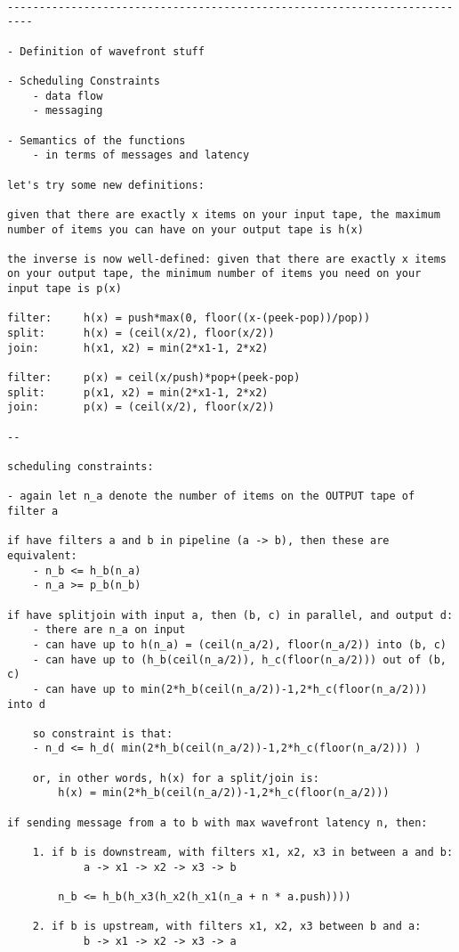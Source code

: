 \begin{verbatim}

--------------------------------------------------------------------------

- Definition of wavefront stuff

- Scheduling Constraints
	- data flow
	- messaging

- Semantics of the functions
	- in terms of messages and latency

let's try some new definitions:

given that there are exactly x items on your input tape, the maximum
number of items you can have on your output tape is h(x)

the inverse is now well-defined: given that there are exactly x items
on your output tape, the minimum number of items you need on your
input tape is p(x)

filter:		h(x) = push*max(0, floor((x-(peek-pop))/pop))
split:		h(x) = (ceil(x/2), floor(x/2))
join:		h(x1, x2) = min(2*x1-1, 2*x2)

filter:		p(x) = ceil(x/push)*pop+(peek-pop)
split:		p(x1, x2) = min(2*x1-1, 2*x2)
join:		p(x) = (ceil(x/2), floor(x/2))

--

scheduling constraints:

- again let n_a denote the number of items on the OUTPUT tape of filter a

if have filters a and b in pipeline (a -> b), then these are equivalent:
	- n_b <= h_b(n_a)
	- n_a >= p_b(n_b)

if have splitjoin with input a, then (b, c) in parallel, and output d:
	- there are n_a on input
	- can have up to h(n_a) = (ceil(n_a/2), floor(n_a/2)) into (b, c)
	- can have up to (h_b(ceil(n_a/2)), h_c(floor(n_a/2))) out of (b, c)
	- can have up to min(2*h_b(ceil(n_a/2))-1,2*h_c(floor(n_a/2))) into d

	so constraint is that:
	- n_d <= h_d( min(2*h_b(ceil(n_a/2))-1,2*h_c(floor(n_a/2))) )

	or, in other words, h(x) for a split/join is:
		h(x) = min(2*h_b(ceil(n_a/2))-1,2*h_c(floor(n_a/2)))

if sending message from a to b with max wavefront latency n, then:
	
	1. if b is downstream, with filters x1, x2, x3 in between a and b:
			a -> x1 -> x2 -> x3 -> b

		n_b <= h_b(h_x3(h_x2(h_x1(n_a + n * a.push))))

	2. if b is upstream, with filters x1, x2, x3 between b and a:
			b -> x1 -> x2 -> x3 -> a


\end{verbatim}
